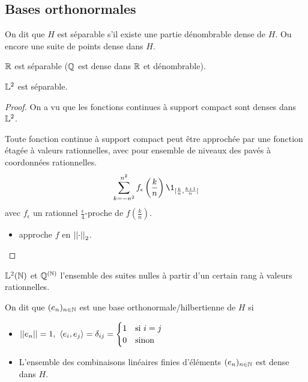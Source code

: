 \subsection{Bases orthonormales}


\begin{definition}
	On dit que $H$ est séparable s'il existe une partie dénombrable dense de $H$. Ou encore une suite de points dense dans $H$.
\end{definition}


\begin{example}
	$\mathbb{R}$ est séparable ($\mathbb{Q}$ est dense dans $\mathbb{R}$ et dénombrable).
\end{example}

\begin{example}
	$\mathbb{L}^2$ est séparable.
\end{example}

\begin{proof}
	On a vu que les fonctions continues à support compact sont denses dans $\mathbb{L}^2$.


	Toute fonction continue à support compact peut être approchée par une fonction étagée à valeurs rationnelles,
	avec pour ensemble de niveaux des pavés à coordonnées rationnelles.
	$$ \sum_{k=-n^2}^{n^2} f_{\epsilon} \left(\frac k n\right) \1_{[\frac k n, \frac {k+1} n[} $$
	avec $f_{\epsilon}$ un rationnel $\frac {\epsilon} 4$-proche de $f\left(\frac k n\right)$.

	\begin{itemize}
		\item approche $f$ en $\left|\left|\cdot\right|\right|_2$.
	\end{itemize}

\end{proof}

\begin{example}
	$\mathbb{L}^2(\mathbb{N})$ et $\mathbb{Q}^{(\mathbb{N})}$ l'ensemble des suites nulles à partir d'un certain rang à valeurs rationnelles.
\end{example}

\begin{definition}
	On dit que $(e_n)_{n\in \mathbb{N}}$ est une base orthonormale/hilbertienne de $H$ si
	\begin{itemize}
		\item $\left|\left|e_n\right|\right| = 1, \ \left\langle e_i, e_j \right\rangle = \delta_{ij} = \begin{cases} 1 & \text{si } i=j \\ 0 & \text{sinon} \end{cases}$
		\item L'ensemble des combinaisons linéaires finies d'éléments $(e_n)_{n\in \mathbb{N}}$ est dense dans $H$.
	\end{itemize}
\end{definition}


